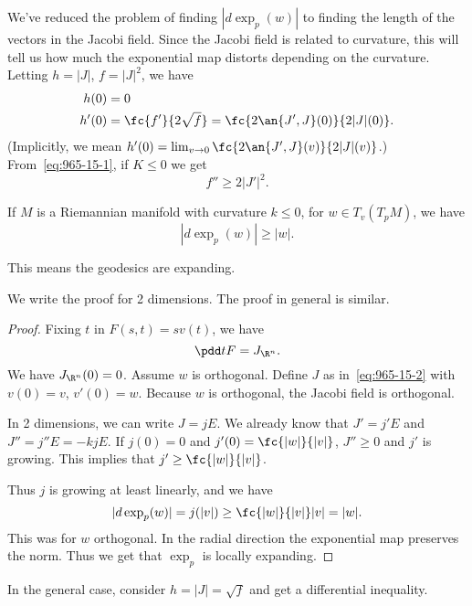 We've reduced the problem of finding $|d\exp_p(w)|$ to finding the length of the vectors in the Jacobi field. Since the Jacobi field is related to curvature, this will tell us how much the exponential map distorts depending on the curvature. Letting $h=|J|$, $f=|J|^2$, we have %
\begin{align*}
h(0)&=0\\
h'(0)&=\fc{f'}{2\sqrt f}=\fc{2\an{J',J}(0)}{2|J|(0)}.
\end{align*}
(Implicitly, we mean $h'(0)=\lim_{v\to 0}\fc{2\an{J',J}(v)}{2|J|(v)}$.)
From~\eqref{eq:965-15-1}, if $K\le 0$ we get
\[
f''\ge 2|J'|^2.
\]
\begin{lem}
If $M$ is a Riemannian manifold with curvature $k\le 0$, for $w\in T_v(T_pM)$, we have %
\[
|d\exp_p(w)|\ge |w|.
\]
\end{lem}
This means the geodesics are expanding. %

We write the proof for 2 dimensions. The proof in general is similar.
\begin{proof}
Fixing $t$ in $F(s,t)=sv(t)$, we have
\[
\pdd tF=J_{\R^n}.
\]
We have $J_{\R^n}(0)=0$.%
Assume $w$ is orthogonal. Define $J$ as in~\eqref{eq:965-15-2} with $v(0)=v$, $v'(0)=w$. Because $w$ is orthogonal, the Jacobi field is orthogonal.

In 2 dimensions, we can write $J=jE$. We already know that $J'=j'E$ and $J''=j'' E=-kjE$. If $j(0)=0$ and $j'(0)=\fc{|w|}{|v|}$,  $J''\ge 0$ and $j'$ is growing. This implies that $j'\ge \fc{|w|}{|v|}$. %

Thus $j$ is growing at least linearly, and we have 
\[|d\exp_p(w)|=j(|v|)\ge\fc{|w|}{|v|}|v|=|w|.\]
This was for $w$ orthogonal. In the radial direction the exponential map preserves the norm. %
Thus we get that $\exp_p$ is locally expanding.
\end{proof}
In the general case, consider $h=|J|=\sqrt f$ and get a differential inequality. 

